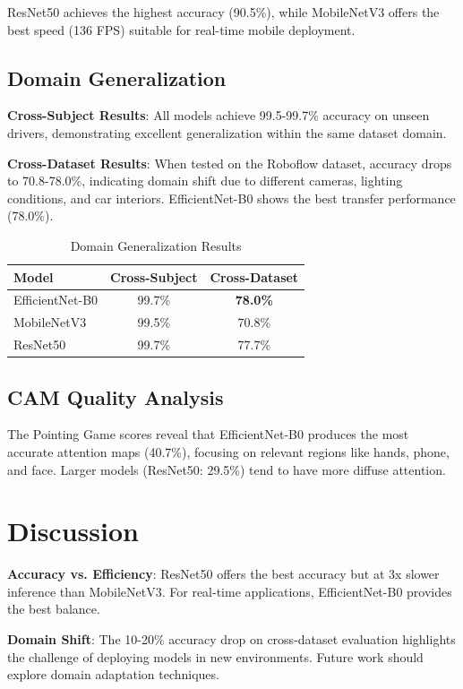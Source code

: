 \documentclass[conference]{IEEEtran}
\begin{document}
ResNet50 achieves the highest accuracy (90.5\%), while MobileNetV3 offers the best speed (136 FPS) suitable for real-time mobile deployment.

\subsection{Domain Generalization}

\textbf{Cross-Subject Results}: All models achieve 99.5-99.7\% accuracy on unseen drivers, demonstrating excellent generalization within the same dataset domain.

\textbf{Cross-Dataset Results}: When tested on the Roboflow dataset, accuracy drops to 70.8-78.0\%, indicating domain shift due to different cameras, lighting conditions, and car interiors. EfficientNet-B0 shows the best transfer performance (78.0\%).

\begin{table}[h]
\centering
\caption{Domain Generalization Results}
\label{tab:domain}
\begin{tabular}{lcc}
\toprule
Model & Cross-Subject & Cross-Dataset \\
\midrule
EfficientNet-B0 & 99.7\% & \textbf{78.0\%} \\
MobileNetV3 & 99.5\% & 70.8\% \\
ResNet50 & 99.7\% & 77.7\% \\
\bottomrule
\end{tabular}
\end{table}

\subsection{CAM Quality Analysis}

The Pointing Game scores reveal that EfficientNet-B0 produces the most accurate attention maps (40.7\%), focusing on relevant regions like hands, phone, and face. Larger models (ResNet50: 29.5\%) tend to have more diffuse attention.

\section{Discussion}

\textbf{Accuracy vs. Efficiency}: ResNet50 offers the best accuracy but at 3x slower inference than MobileNetV3. For real-time applications, EfficientNet-B0 provides the best balance.

\textbf{Domain Shift}: The 10-20\% accuracy drop on cross-dataset evaluation highlights the challenge of deploying models in new environments. Future work should explore domain adaptation techniques.
\end{document}

